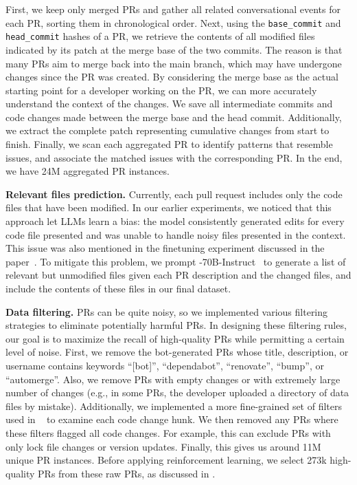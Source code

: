 First, we keep only merged PRs and gather all related conversational events for each PR, sorting them in chronological order. Next, using the \texttt{base\_commit} and \texttt{head\_commit} hashes of a PR, we retrieve the contents of all modified files indicated by its patch at the merge base of the two commits.
The reason is that many PRs aim to merge back into the main branch, which may have undergone changes since the PR was created. By considering the merge base as the actual starting point for a developer working on the PR, we can more accurately understand the context of the changes.
We save all intermediate commits and code changes made between the merge base and the head commit. Additionally, we extract the complete patch representing cumulative changes from start to finish.
Finally, we scan each aggregated PR to identify patterns that resemble issues, and associate the matched issues with the corresponding PR. In the end, we have 24M aggregated PR instances.

\textbf{Relevant files prediction.}
Currently, each pull request includes only the code files that have been modified. In our earlier experiments, we noticed that this approach let LLMs learn a bias: the model consistently generated edits for every code file presented and was unable to handle noisy files presented in the context. This issue was also mentioned in the finetuning experiment discussed in the \swebench{} paper~\cite{swebench}.
To mitigate this problem, we prompt -70B-Instruct~\cite{llama31} to generate a list of relevant but unmodified files given each PR description and the changed files, and include the contents of these files in our final dataset.

\textbf{Data filtering.}
\github PRs can be quite noisy, so we implemented various filtering strategies to eliminate potentially harmful PRs. In designing these filtering rules, our goal is to maximize the recall of high-quality PRs while permitting a certain level of noise.
First, we remove the bot-generated PRs whose title, description, or username contains keywords ``[bot]'', ``dependabot'', ``renovate'', ``bump'', or ``automerge''.
Also, we remove PRs with empty changes or with extremely large number of changes (e.g., in some PRs, the developer uploaded a directory of data files by mistake).
Additionally, we implemented a more fine-grained set of filters used in \codellama~\cite{codellama} to examine each code change hunk. We then removed any PRs where these filters flagged all code changes. For example, this can exclude PRs with only lock file changes or version updates.
Finally, this gives us around 11M unique PR instances.
Before applying reinforcement learning, we select 273k high-quality PRs from these raw PRs, as discussed in .

